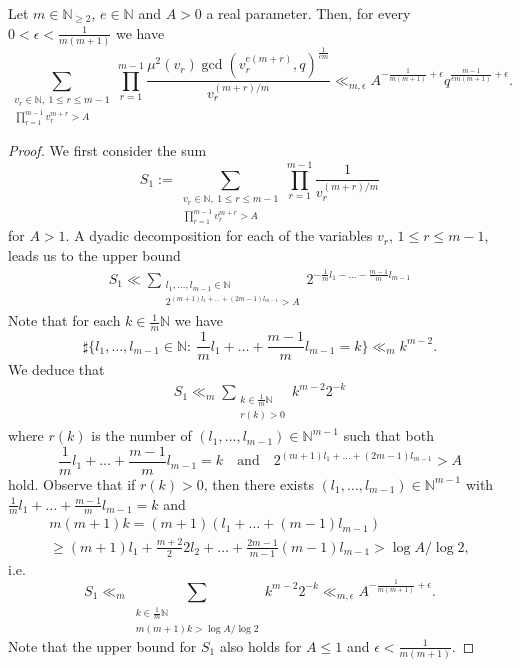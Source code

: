 \documentclass[10pt,a4paper]{amsart}
\begin{document}
\begin{lemma}\label{lemdecay}
Let $m\in \mathbb{N}_{\geq 2}$, $e\in \mathbb{N}$ and $A>0$ a real parameter. Then, for every $0<\epsilon <\frac{1}{m(m+1)}$ we have
\begin{equation*}
 \sum_{\substack{ v_{r}\in \mathbb{N},\ 1\leq r\leq m-1\\\prod_{r=1}^{m-1} v_{r}^{m+r}>A }} \prod_{r=1}^{m-1}\frac{\mu^2( v_{r})\gcd( v_{r}^{e(m+r)},q)^\frac 1{em}}{ v_{r}^{(m+r)/m}} \ll_{m,\epsilon} A^{-\frac{1}{m(m+1)}+\epsilon} q^{\frac{m-1}{em(m+1)}+\epsilon}.
\end{equation*}


\end{lemma}

\begin{proof}
We first consider the sum
$$S_1:=  \sum_{\substack{ v_{r}\in \mathbb{N},\ 1\leq r\leq m-1\\\prod_{r=1}^{m-1} v_{r}^{m+r}>A }} \prod_{r=1}^{m-1}\frac{1}{ v_{r}^{(m+r)/m}}$$
for $A>1$. A dyadic decomposition for each of the variables $v_r$, $1\leq r\leq m-1$, leads us to the upper bound
\begin{gather*}
S_1\ll \sum_{\substack{l_1,\ldots, l_{m-1}\in \mathbb{N}\\ 2^{(m+1)l_1+\ldots + (2m-1)l_{m-1}}>A}} 2^{-\frac{1}{m}l_1-\ldots - \frac{m-1}{m} l_{m-1}} 
\end{gather*}
Note that for each $k\in \frac{1}{m}\mathbb{N}$ we have
$$\sharp\{l_1,\ldots, l_{m-1}\in \mathbb{N}:\ \frac{1}{m}l_1+\ldots + \frac{m-1}{m} l_{m-1}=k\}\ll_m k^{m-2}.$$
We deduce that
\begin{gather*}
S_1\ll_m \sum_{\substack{k\in \frac{1}{m}\mathbb{N}\\ r(k)>0}} k^{m-2} 2^{-k} 
\end{gather*}
where $r(k)$ is the number of $(l_1,\ldots, l_{m-1})\in \mathbb{N}^{m-1}$ such that both $$\frac{1}{m}l_1+\ldots + \frac{m-1}{m} l_{m-1}=k \quad \mbox{and}\quad 2^{(m+1)l_1+\ldots + (2m-1)l_{m-1}}>A$$ hold. Observe that if $r(k)>0$, then there exists $(l_1,\ldots, l_{m-1})\in \mathbb{N}^{m-1}$ with $\frac{1}{m}l_1+\ldots + \frac{m-1}{m} l_{m-1}=k $ and
\begin{gather*}
m(m+1)k=(m+1) \left(l_1+\ldots + (m-1) l_{m-1}\right)\\  \geq (m+1) l_1+ \frac{m+2}{2} 2 l_2+\ldots + \frac{2m-1}{m-1} (m-1)l_{m-1}> \log A/\log 2,
\end{gather*}
i.e. 
$$S_1\ll_m \sum_{\substack{ k\in \frac{1}{m}\mathbb{N}\\m(m+1)k>\log A/\log 2}} k^{m-2} 2^{-k}\ll_{m,\epsilon} A^{-\frac{1}{m(m+1)}+\epsilon}.$$
Note that the upper bound for $S_1$ also holds for $A\leq1$ and $\epsilon < \frac{1}{m(m+1)}$.\par


\end{proof}
\end{document}
